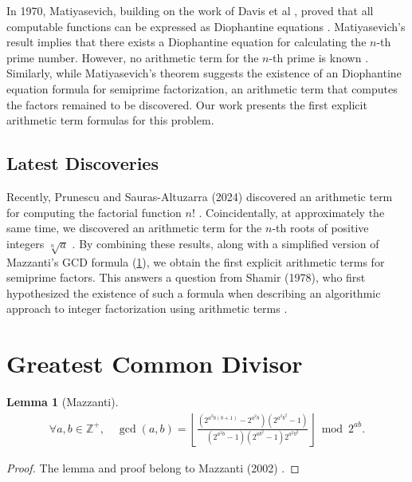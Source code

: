 \documentclass[11pt,reqno]{article}
\theoremstyle{plain}
\newtheorem{lemma}[theorem]{Lemma}
\theoremstyle{definition}
\newcommand{\floor}[1]{\left\lfloor #1 \right\rfloor}
\newcommand{\Z}{\mathbb{Z}}
\begin{document}
In 1970, Matiyasevich, building on the work of Davis et al \cite{davis1961diophantine}, proved that all computable functions can be expressed as Diophantine equations \cite{matiyasevich1980diophantine, matiyasevich1993hilbert}. Matiyasevich's result implies that there exists a Diophantine equation for calculating the $n$-th prime number. However,  no arithmetic term for the $n$-th prime is known \cite{prunescu2024factorial}. Similarly, while Matiyasevich's theorem suggests the existence of an Diophantine equation formula for semiprime factorization, an arithmetic term that computes the factors remained to be discovered. Our work presents the first explicit arithmetic term formulas for this problem.

\subsection{Latest Discoveries}

Recently, Prunescu and Sauras-Altuzarra (2024) discovered an arithmetic term for computing the factorial function $n!$ \cite{prunescu2024factorial}. Coincidentally, at approximately the same time, we discovered an arithmetic term for the $n$-th roots of positive integers $\sqrt[n]{a}$ \cite{shunia2024polynomial}. By combining these results, along with a simplified version of Mazzanti's GCD formula (\cref{proof:mazzantigcd}), we obtain the first explicit arithmetic terms for semiprime factors. This answers a question from Shamir (1978), who first hypothesized the existence of such a formula when describing an algorithmic approach to integer factorization using arithmetic terms \cite{shamir1978factoring}.

\section{Greatest Common Divisor} \label{section:gcd}

\begin{lemma}[Mazzanti] \label{proof:mazzantigcd}
\begin{align*}
\forall a,b \in \Z^+, \quad
\gcd(a,b) = \floor{\frac{(2^{a^2 b(b+1)} - 2^{a^2 b}) (2^{a^2 b^2} - 1)}
         {(2^{a^2 b} - 1)(2^{ab^2}-1)2^{a^2 b^2}}} \bmod 2^{ab}.
\end{align*}
\end{lemma}
\begin{proof}
The lemma and proof belong to Mazzanti (2002) \cite{mazzanti2002plainbases}.
\end{proof}
\end{document}

